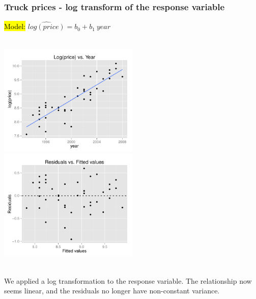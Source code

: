 \documentclass[11pt,containsverbatim,handout,xcolor=xelatex,dvipsnames,table]{beamer}
\begin{document}
\begin{frame}
\frametitle{Truck prices - log transform of the response variable}

\hl{Model:} $\widehat{log(price)} = b_0 + b_1~year$

$\:$ \\

\includegraphics[width=0.5\textwidth]{figures/pickup/pu_price_year_scat_log} 
\includegraphics[width=0.5\textwidth]{figures/pickup/pu_price_year_res_log}

\pause

$\:$ \\

We applied a log transformation to the response variable. The relationship now seems linear, and the residuals 
no longer have non-constant variance.

\end{frame}

\end{document}
